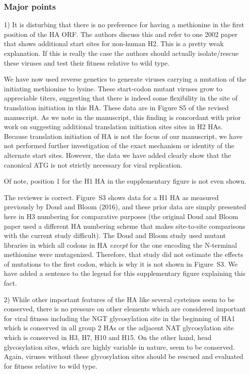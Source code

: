 \documentclass[11pt, oneside]{article}   	%
\newcommand{\response}[1]{{\color{black}#1}}
\begin{document}
\subsubsection*{Major points} 

1) It is disturbing that there is no preference for having a methionine in the first position of the HA ORF. The authors discuss this and refer to one 2002 paper that shows additional start sites for non-human H2. This is a pretty weak explanation. If this is really the case the authors should actually isolate/rescue these viruses and test their fitness relative to wild type. 

\response{
We have now used reverse genetics to generate viruses carrying a mutation of the initiating methionine to lysine.
These start-codon mutant viruses grow to appreciable titers, suggesting that there is indeed some flexibility in the site of translation initiation in this HA.
These data are in Figure S5 of the revised manuscript.
As we note in the manuscript, this finding is concordant with prior work on suggesting additional translation initiation sites sites in H2 HAs.
Because translation initiation of HA is not the focus of our manuscript, we have not performed further investigation of the exact mechanism or identity of the alternate start sites.
However, the data we have added clearly show that the canonical ATG is not strictly necessary for viral replication.
}

Of note, position 1 for the H1 HA in the supplementary figure is not even shown. 

\response{
The reviewer is correct. 
Figure~S3 shows data for a H1 HA as measured previously by Doud and Bloom (2016), and these prior data are simply presented here in H3 numbering for comparative purposes (the original Doud and Bloom paper used a different HA numbering scheme that makes site-to-site comparisons with the current study difficult). 
The Doud and Bloom study used mutant libraries in which all codons in HA \emph{except} for the one encoding the N-terminal methionine were mutagenized.
Therefore, that study did not estimate the effects of mutations to the first codon, which is why it is not shown in Figure~S3.
We have added a sentence to the legend for this supplementary figure explaining this fact.
}

2) While other important features of the HA like several cysteines seem to be conserved, there is no pressure on other elements which are considered important for viral fitness including the NGT glycosylation site in the beginning of HA1 which is conserved in all group 2 HAs or the adjacent NAT glycosylation site which is conserved in H3, H7, H10 and H15. On the other hand, head glycosylation sites, which are highly variable in nature, seem to be conserved. Again, viruses without these glycosylation sites should be rescued and evaluated for fitness relative to wild type. 
\end{document}
